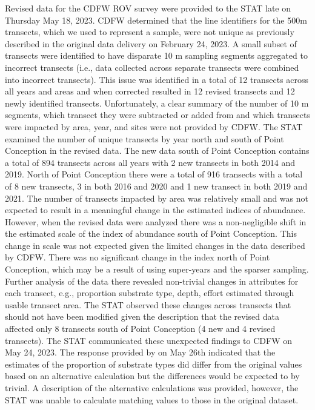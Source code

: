 \documentclass[
  letterpaper,
]{article}
\begin{document}
Revised data for the CDFW ROV survey were provided to the STAT late on Thursday May 18, 2023. CDFW determined that the line identifiers for the 500m transects, which we used to represent a sample, were not unique as previously described in the original data delivery on February 24, 2023. A small subset of transects were identified to have disparate 10 m sampling segments aggregated to incorrect transects (i.e., data collected across separate transects were combined into incorrect transects). This issue was identified in a total of 12 transects across all years and areas and when corrected resulted in 12 revised transects and 12 newly identified transects. Unfortunately, a clear summary of the number of 10 m segments, which transect they were subtracted or added from and which transects were impacted by area, year, and sites were not provided by CDFW. The STAT examined the number of unique transects by year north and south of Point Conception in the revised data. The new data south of Point Conception contains a total of 894 transects across all years with 2 new transects in both 2014 and 2019. North of Point Conception there were a total of 916 transects with a total of 8 new transects, 3 in both 2016 and 2020 and 1 new transect in both 2019 and 2021. The number of transects impacted by area was relatively small and was not expected to result in a meaningful change in the estimated indices of abundance. However, when the revised data were analyzed there was a non-negligible shift in the estimated scale of the index of abundance south of Point Conception. This change in scale was not expected given the limited changes in the data described by CDFW. There was no significant change in the index north of Point Conception, which may be a result of using super-years and the sparser sampling. Further analysis of the data there revealed non-trivial changes in attributes for each transect, e.g., proportion substrate type, depth, effort estimated through usable transect area. The STAT observed these changes across transects that should not have been modified given the description that the revised data affected only 8 transects south of Point Conception (4 new and 4 revised transects). The STAT communicated these unexpected findings to CDFW on May 24, 2023. The response provided by on May 26th indicated that the estimates of the proportion of substrate types did differ from the original values based on an alternative calculation but the differences would be expected to by trivial. A description of the alternative calculations was provided, however, the STAT was unable to calculate matching values to those in the original dataset.
\end{document}
